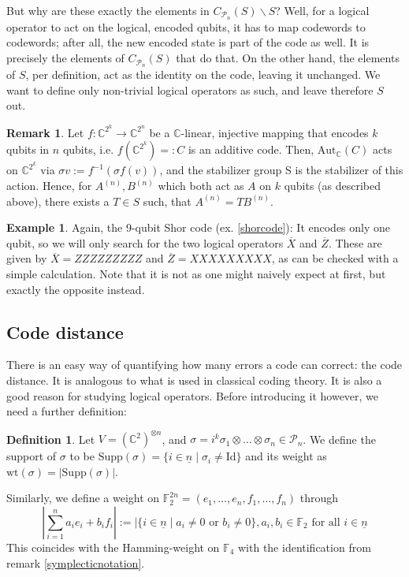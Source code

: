 \documentclass{article}
\def\P{\mathcal{P}}
\def\F{\mathbb{F}}
\def\C{\mathbb{C}}
\def\supp{\text{Supp}}
\def\n{\underline{n}}
\def\fa{\text{ for all }}
\def\Id{\text{Id}}
\def\wt{\text{wt}}
\theoremstyle{definition}
\newtheorem{ex}[Satz]{Example}
\newtheorem{rem}[Satz]{Remark}
\newtheorem{defn}[Satz]{Definition}
\begin{document}
But why are these exactly the elements in $C_{\P_n}(S) \backslash S$? Well, for a logical operator to act on the logical, encoded qubits, it has to map codewords to codewords; after all, the new encoded state is part of the code as well.
It is precisely the elements of $C_{\P_n}(S)$ that do that. On the other hand, the elements of $S$, per definition, act as the identity on the code, leaving it unchanged. We want to define only non-trivial logical operators as such, and leave therefore $S$ out.

\begin{rem}
Let $f: \C^{2^k} \rightarrow \C^{2^n}$ be a $\C$-linear, injective mapping that encodes $k$ qubits in $n$ qubits, i.e. $f(\C^{2^k})=:C$ is an additive code. Then, $\text{Aut}_\C(C)$ acts on $\C^{2^k}$ via $\sigma v:= f^{-1}(\sigma f(v))$, and the stabilizer group S is the stabilizer of this action.
Hence, for $A^{(n)}, B^{(n)}$ which both act as $A$ on $k$ qubits (as described above), there exists a $T \in S$ such, that $A^{(n)} = T B^{(n)}$.

\end{rem}

\begin{ex}
Again, the 9-qubit Shor code (ex.  \ref{shorcode}): It encodes only one qubit, so we will only search for the two logical operators $\overline{X}$ and $\overline{Z}$. These are given by $\overline{X} = ZZZZZZZZZ$ and $\overline{Z} = XXXXXXXXX$, as can be checked with a simple calculation. Note that it is not as one might naively expect at first, but exactly the opposite instead.
\end{ex}

\subsection{ Code distance}

There is an easy way of quantifying how many errors a code can correct: the code distance. It is analogous to what is used in classical coding theory. It is also a good reason for studying logical operators. Before introducing it however, we need a further definition:

\begin{defn}\label{weight}
Let $V = (\C^2)^{\otimes n}$, and $\sigma = i^k \sigma_1 \otimes \ldots \otimes \sigma_n \in \mathcal{P}_n$. We define the support of $\sigma$ to be $\supp(\sigma) = \{ i \in \underline{n} \mid \sigma_i \neq \Id \}$ and
its weight as $\wt(\sigma) = | \supp( \sigma) |$. 

Similarly, we define a weight on $\F_2^{2n} = (e_1,\ldots,e_n,f_1,\ldots,f_n)$ through \begin{equation} | \sum_{i=1}^n a_i e_i + b_i f_i | := | \{ i \in \n \mid a_i \neq 0 \text{ or } b_i \neq 0 \}, a_i, b_i \in \F_2 \fa i \in \n \end{equation} This coincides with the Hamming-weight on $\F_4$ with the identification from remark \ref{symplecticnotation}.
\end{defn}
\end{document}
